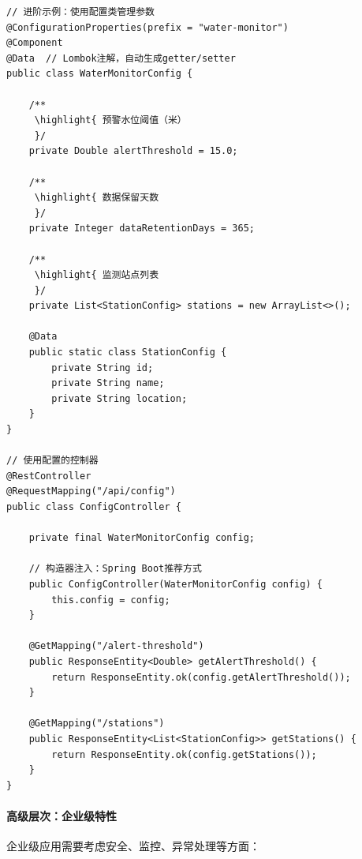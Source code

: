 \begin{lstlisting}[style=java]
// 进阶示例：使用配置类管理参数
@ConfigurationProperties(prefix = "water-monitor")
@Component
@Data  // Lombok注解，自动生成getter/setter
public class WaterMonitorConfig {
    
    /**
     \highlight{ 预警水位阈值（米）
     }/
    private Double alertThreshold = 15.0;
    
    /**
     \highlight{ 数据保留天数
     }/
    private Integer dataRetentionDays = 365;
    
    /**
     \highlight{ 监测站点列表
     }/
    private List<StationConfig> stations = new ArrayList<>();
    
    @Data
    public static class StationConfig {
        private String id;
        private String name;
        private String location;
    }
}

// 使用配置的控制器
@RestController
@RequestMapping("/api/config")
public class ConfigController {
    
    private final WaterMonitorConfig config;
    
    // 构造器注入：Spring Boot推荐方式
    public ConfigController(WaterMonitorConfig config) {
        this.config = config;
    }
    
    @GetMapping("/alert-threshold")
    public ResponseEntity<Double> getAlertThreshold() {
        return ResponseEntity.ok(config.getAlertThreshold());
    }
    
    @GetMapping("/stations")
    public ResponseEntity<List<StationConfig>> getStations() {
        return ResponseEntity.ok(config.getStations());
    }
}
\end{lstlisting}

\hypertarget{ux9ad8ux7ea7ux5c42ux6b21ux4f01ux4e1aux7ea7ux7279ux6027}{%
\paragraph{高级层次：企业级特性}\label{ux9ad8ux7ea7ux5c42ux6b21ux4f01ux4e1aux7ea7ux7279ux6027}}

企业级应用需要考虑安全、监控、异常处理等方面：

